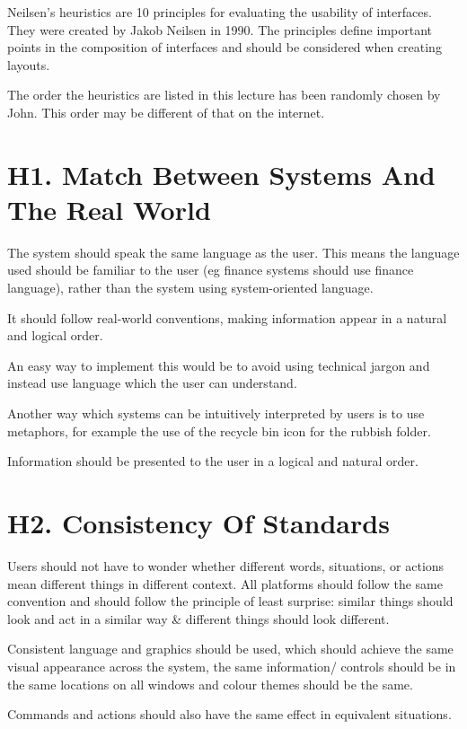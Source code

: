
Neilsen's heuristics are 10 principles for evaluating the usability of interfaces. They were created by Jakob Neilsen in 1990. The principles define important points in the composition of interfaces and should be considered when creating layouts.

The order the heuristics are listed in this lecture has been randomly chosen by John. This order may be different of that on the internet.

\section*{H1. Match Between Systems And The Real World}
The system should speak the same language as the user. This means the language used should be familiar to the user (eg finance systems should use finance language), rather than the system using system-oriented language. 

It should follow real-world conventions, making information appear in a natural and logical order. 

An easy way to implement this would be to avoid using technical jargon and instead use language which the user can understand.

Another way which systems can be intuitively interpreted by users is to use metaphors, for example the use of the recycle bin icon for the rubbish folder. 

Information should be presented to the user in a logical and natural order. 

\section*{H2. Consistency Of Standards}
Users should not have to wonder whether different words, situations, or actions mean different things in different context. All platforms should follow the same convention and should follow the principle of least surprise: similar things should look and act in a similar way \& different things should look different.

Consistent language and graphics should be used, which should achieve the same visual appearance across the system, the same information/ controls should be in the same locations on all windows and colour themes should be the same. 

Commands and actions should also have the same effect in equivalent situations.

